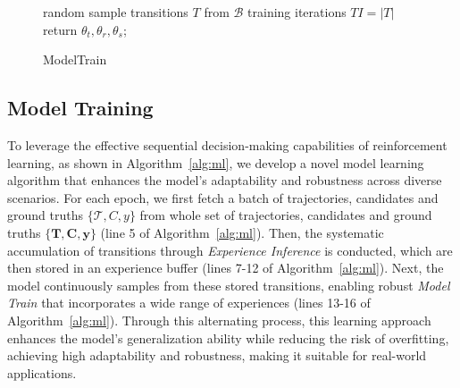 \begin{figure}[!t]
\begin{algorithm}[H]
    \small %
    \renewcommand{\thealgocf}{}  %
    \caption{ModelTrain}
    random sample transitions $T$ from $\mathcal{B}$\;
    training iterations $TI = |T|$\;
    return $\theta_{t}, \theta_{r}, \theta_{s}$;
\end{algorithm}  
\vspace{-0.2in}
\end{figure}

\subsection{Model Training}
\label{sec:5.3}
To leverage the effective sequential decision-making capabilities of reinforcement learning, as shown in Algorithm~\ref{alg:ml}, we develop a novel model learning algorithm that enhances the model's adaptability and robustness across diverse scenarios. For each epoch, we first fetch a batch of trajectories, candidates and ground truths $\{\mathcal{T}, C, y\}$ from whole set of trajectories, candidates and ground truths $\{\mathbf{T}, \mathbf{C}, \mathbf{y}\}$ (line 5 of Algorithm~\ref{alg:ml}). Then, the systematic accumulation of transitions through \textit{Experience Inference} is conducted, which are then stored in an experience buffer (lines 7-12 of Algorithm~\ref{alg:ml}). Next, the model continuously samples from these stored transitions, enabling robust \textit{Model Train} that incorporates a wide range of experiences (lines 13-16 of Algorithm~\ref{alg:ml}). Through this alternating process, this learning approach enhances the model’s generalization ability while reducing the risk of overfitting, achieving high adaptability and robustness, making it suitable for real-world applications.

